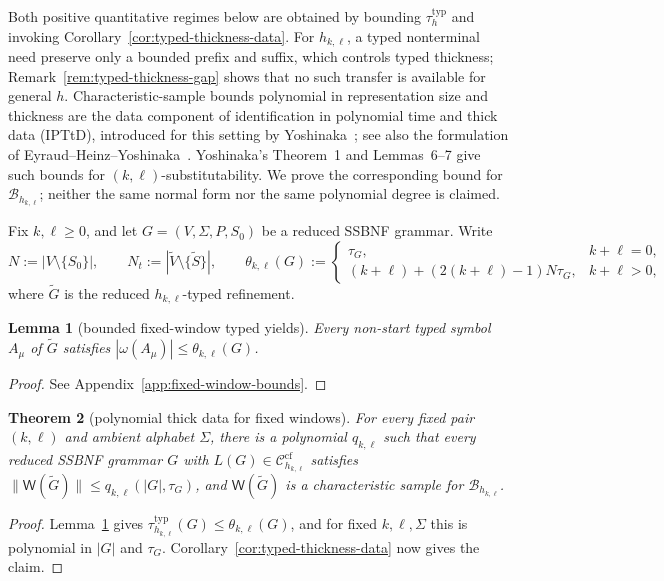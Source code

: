 \documentclass[11pt,a4paper]{article}
\newtheorem{theorem}{Theorem}[section]
\newtheorem{lemma}[theorem]{Lemma}
\theoremstyle{remark}
\theoremstyle{plain}
\newcommand{\WitnessSet}{\mathsf{W}}
\newcommand{\cf}{\mathrm{cf}}
\newcommand{\Ccf}[1]{\mathcal C_{#1}^{\cf}}
\begin{document}
Both positive quantitative regimes below are obtained by bounding
$\tau_h^{\mathrm{typ}}$ and invoking
Corollary~\ref{cor:typed-thickness-data}.  For $h_{k,\ell}$, a typed
nonterminal need preserve only a bounded prefix and suffix, which controls
typed thickness; Remark~\ref{rem:typed-thickness-gap} shows that no
such transfer is available for general $h$.  Characteristic-sample bounds
polynomial in representation size and thickness are the data component of
identification in polynomial time and thick data (IPTtD), introduced for this
setting by Yoshinaka~\cite{yoshinaka2008}; see also the formulation of
Eyraud--Heinz--Yoshinaka~\cite[Definition~2.12]{eyraud-heinz-yoshinaka2016}.
Yoshinaka's Theorem~1 and Lemmas~6--7 give such bounds for
$(k,\ell)$-substitutability.  We prove the corresponding
bound for $\mathcal B_{h_{k,\ell}}$; neither the same normal form nor the
same polynomial degree is claimed.

Fix $k,\ell\ge0$, and let $G=(V,\Sigma,P,S_0)$ be a reduced SSBNF grammar.  Write
\[
 N:=|V\setminus\{S_0\}|,\qquad
 N_t:=|\widetilde V\setminus\{\widetilde S\}|,\qquad
 \theta_{k,\ell}(G):=
 \begin{cases}
   \tau_G, & k+\ell=0,\\[1mm]
   (k+\ell)+(2(k+\ell)-1)N\tau_G, & k+\ell>0,
 \end{cases}
\]
where $\widetilde G$ is the reduced $h_{k,\ell}$-typed refinement.

\begin{lemma}[bounded fixed-window typed yields]
\label{lem:window-typed-yield}
Every non-start typed symbol $A_\mu$ of $\widetilde G$ satisfies
$|\omega(A_\mu)|\le\theta_{k,\ell}(G)$.
\end{lemma}

\begin{proof}
See Appendix~\ref{app:fixed-window-bounds}.
\end{proof}

\begin{theorem}[polynomial thick data for fixed windows]
\label{thm:window-thick}
For every fixed pair $(k,\ell)$ and ambient alphabet $\Sigma$, there is a
polynomial $q_{k,\ell}$ such that every reduced SSBNF grammar $G$ with
$L(G)\in\Ccf{h_{k,\ell}}$ satisfies
$\|\WitnessSet(\widetilde G)\| \le q_{k,\ell}(|G|,\tau_G)$,
and $\WitnessSet(\widetilde G)$ is a characteristic sample for
$\mathcal B_{h_{k,\ell}}$.
\end{theorem}

\begin{proof}
Lemma~\ref{lem:window-typed-yield} gives
$\tau_{h_{k,\ell}}^{\mathrm{typ}}(G)\le\theta_{k,\ell}(G)$, and for
fixed $k,\ell,\Sigma$ this is polynomial in $|G|$ and $\tau_G$.
Corollary~\ref{cor:typed-thickness-data} now gives the claim.
\end{proof}
\end{document}
